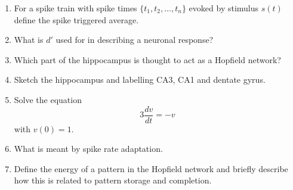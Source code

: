 \documentclass[a4paper,12pt]{article}
\newif\ifsoln
\begin{document}
\begin{enumerate}
\ifsoln Solution:  millivolts.\fi


\item For a spike train with spike times $\{t_1,t_2,\ldots,t_n\}$ evoked by stimulus $s(t)$ define the spike triggered average.

\ifsoln Solution:  $$S(\tau)=\frac{1}{n}\sum_i s(t_i-\tau)$$. \fi


\item What is $d'$ used for in describing a neuronal response?

\ifsoln Solution:  It measures the difference between two sets of multi-trial responses.\fi


\item Which part of the hippocampus is thought to act as a Hopfield network?

\ifsoln Solution:  CA3 \fi


\item Sketch the hippocampus and labelling CA3, CA1 and dentate gyrus.

\ifsoln Solution:  Should show two interlocking horseshoe shapes, the smaller is the dentate gyrus, the larger contains CA3 and CA1, CA3 is at the end that interlocks with the dentate gyrus. \fi


\item Solve the equation
$$3\frac{dv}{dt}=-v$$
with $v(0)=1$.

\ifsoln
Solved by ansatz or integrating factor this give $v=\exp{(-t/3)}$.
\fi


\item What is meant by spike rate adaptation.

\ifsoln Solution: When ongoing stimulation causes a neuron to fire the firing rate often drops even if the stimulation does not.\fi

\item Define the energy of a pattern in the Hopfield network and
  briefly describe how this is related to pattern storage and
  completion.

\ifsoln Solution: 
The energy is given by 
$$E=-\frac{1}{2}\sum_{ij}x_iw_{ij}x_j$$
and stored patterns correspond to local minima.
\fi

\end{enumerate}
\end{document}
